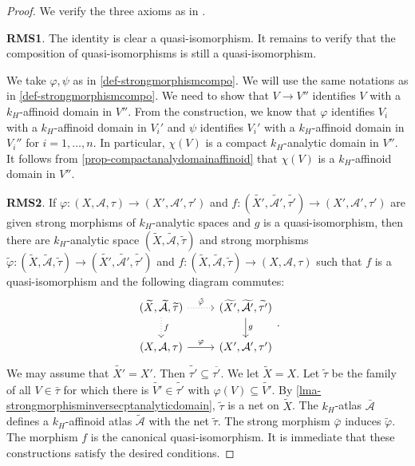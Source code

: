 \begin{proof}
    We verify the three axioms as in \cite[\href{https://stacks.math.columbia.edu/tag/04VC}{Tag 04VC}]{stacks-project}.

    \textbf{RMS1}. The identity is clear a quasi-isomorphism. It remains to verify that the composition of quasi-isomorphisms is still a quasi-isomorphism.

    We take $\varphi,\psi$ as in \cref{def-strongmorphismcompo}. We will use the same notations as in \cref{def-strongmorphismcompo}. We need to show that $V\rightarrow V''$ identifies $V$ with a $k_H$-affinoid domain in $V''$. From the construction, we know that $\varphi$ identifies $V_i$ with a $k_H$-affinoid domain in $V_i'$ and $\psi$ identifies $V_i'$ with a $k_H$-affinoid domain in $V_i''$ for $i=1,\ldots,n$. In particular, $\chi(V)$ is a compact $k_H$-analytic domain in $V''$. It follows from \cref{prop-compactanalydomainaffinoid} that $\chi(V)$ is a $k_H$-affinoid domain in $V''$.

    \textbf{RMS2}.
    If $\varphi:(X,\mathcal{A},\tau)\rightarrow (X',\mathcal{A}',\tau')$ and $f:(\widetilde{X'},\widetilde{\mathcal{A}'},\widetilde{\tau'})\rightarrow (X',\mathcal{A}',\tau')$ are given strong morphisms of $k_H$-analytic spaces and $g$ is a quasi-isomorphism, then there are $k_H$-analytic space $(\widetilde{X},\widetilde{\mathcal{A}},\widetilde{\tau})$ and strong morphisms $\tilde{\varphi}:(\widetilde{X},\widetilde{\mathcal{A}},\widetilde{\tau})\rightarrow (\widetilde{X'},\widetilde{\mathcal{A}'},\widetilde{\tau'})$ and $f:(\widetilde{X},\widetilde{\mathcal{A}},\widetilde{\tau})\rightarrow (X,\mathcal{A},\tau)$ such that $f$ is a quasi-isomorphism and the following diagram commutes:  
    \[
        \begin{tikzcd}
            {(\widetilde{X},\widetilde{\mathcal{A}},\widetilde{\tau})} \arrow[r, "\tilde{\varphi}", dotted] \arrow[d, "f", dotted] & {(\widetilde{X'},\widetilde{\mathcal{A}'},\widetilde{\tau'})} \arrow[d, "g"] \\
            {(X,\mathcal{A},\tau)} \arrow[r, "\varphi"]                                                                            & {(X',\mathcal{A}',\tau')}                                                   
        \end{tikzcd}.
    \]  
    We may assume that $\widetilde{X'}=X'$. Then $\widetilde{\tau'}\subseteq \overline{\tau'}$. We let $\tilde{X}=X$. Let $\tilde{\tau}$ be the family of all $V\in \bar{\tau}$ for which there is $\widetilde{V'}\in\widetilde{\tau'}$ with $\varphi(V)\subseteq \widetilde{V'}$. By \cref{lma-strongmorphisminversecptanalyticdomain}, $\tilde{\tau}$ is a net on $\tilde{X}$. The $k_H$-atlas $\bar{\mathcal{A}}$ defines a $k_H$-affinoid atlas $\tilde{\mathcal{A}}$ with the net $\tilde{\tau}$. The strong morphism $\bar{\varphi}$ induces $\tilde{\varphi}$. The morphism $f$ is the canonical quasi-isomorphism. It is immediate that these constructions satisfy the desired conditions.


\end{proof}
